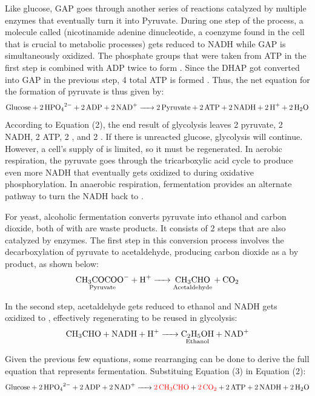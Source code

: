 \documentclass{article}
\begin{document}
Like glucose, GAP goes through another series of reactions catalyzed by multiple enzymes that eventually turn it into Pyruvate. During one step of the process, a molecule called  (nicotinamide adenine dinucleotide, a coenzyme found in the cell that is crucial to metabolic processes) \parencite{ref} gets reduced to NADH while GAP is simultaneously oxidized. The phosphate groups that were taken from ATP in the first step is combined with ADP twice to form . Since the DHAP got converted into GAP in the previous step, 4 total ATP is formed \parencite{ref}. Thus, the net equation for the formation of pyruvate is thus given by:
\begin{equation}
    \ce{Glucose + 2HPO_{4}^{2-} + 2ADP + 2NAD+ -> 2Pyruvate + 2ATP + 2 NADH + 2H+ + 2H2O}
\end{equation} %
According to Equation (2), the end result of glycolysis leaves 2 pyruvate, 2 NADH, 2 ATP, 2 , and 2 . If there is unreacted glucose, glycolysis will continue. However, a cell's supply of  is limited, so it must be regenerated. In aerobic respiration, the pyruvate goes through the tricarboxylic acid cycle to produce even more NADH that eventually gets oxidized to  during oxidative phosphorylation. In anaerobic respiration, fermentation provides an alternate pathway to turn the NADH back to .

\medskip

For yeast,  alcoholic fermentation converts pyruvate into ethanol and carbon dioxide, both of with are waste products. It consists of 2 steps that are also catalyzed by enzymes. The first step in this conversion process involves the decarboxylation of pyruvate to acetaldehyde, producing carbon dioxide as a by product, as shown below:
\begin{equation}
    \ce{\underset{\text{Pyruvate}}{\ce{CH3COCOO-}} + H+ -> \underset{\text{Acetaldehyde}}{\ce{CH3CHO}} + CO2}
\end{equation}

In the second step, acetaldehyde gets reduced to ethanol and NADH gets oxidized to , effectively regenerating  to be reused in glycolysis:
\begin{equation}
    \ce{CH3CHO + NADH + H+ -> \underset{\text{Ethanol}}{\ce{C2H5OH}} + \ce{NAD+}}
\end{equation}

Given the previous few equations, some rearranging can be done to derive the full equation that represents fermentation. Substituing Equation (3) in Equation (2):
\begin{equation*}
    \ce{Glucose + 2HPO_{4}^{2-} + 2ADP + 2NAD+ -> \textcolor{red}{\ce{2CH3CHO}} + \textcolor{red}{\ce{2CO2}} + 2ATP + 2NADH + 2H2O}
\end{equation*}
\end{document}
